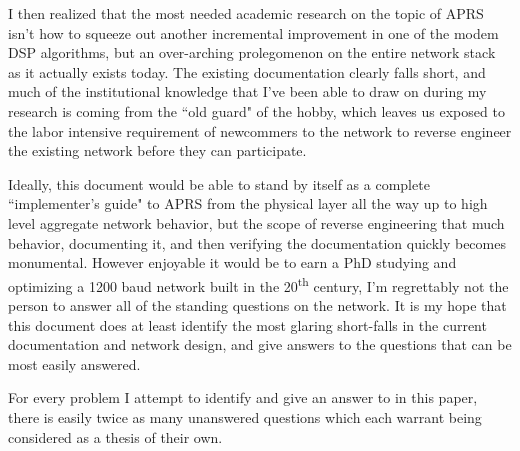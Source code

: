I then realized that the most needed academic research on the topic of APRS isn't
how to squeeze out another incremental improvement in one of the modem DSP
algorithms, but an over-arching prolegomenon on the entire network stack as it 
actually exists today. The existing documentation clearly falls short, and 
much of the institutional knowledge that I've been able to draw on during 
my research is coming from the ``old guard" of the hobby, which leaves us exposed
to the labor intensive requirement of newcommers to the network to 
reverse engineer the existing network before they can participate.

Ideally, this document would be able to stand by itself as a complete 
``implementer's guide" to APRS from the physical layer all the way up to high level
aggregate network behavior, but the scope of reverse engineering that much
behavior, documenting it, and then verifying the documentation quickly becomes
monumental. However enjoyable it would be to earn a PhD studying and optimizing
a 1200 baud network built in the 20\textsuperscript{th} century, I'm regrettably 
not the person to answer all of the standing questions on the network. 
It is my hope that this document does at least identify the most glaring 
short-falls in the current documentation and network design, and give answers to
the questions that can be most easily answered.

For every problem I attempt to identify and give an answer to in this paper, there
is easily twice as many unanswered questions which each warrant being considered 
as a thesis of their own.
